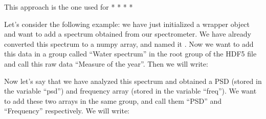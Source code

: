 \documentclass[letterpaper,10pt,english]{sphinxmanual}
\begin{document}
\sphinxAtStartPar
This approach is the one used for
* 
* 
* 
* 

\sphinxAtStartPar
{}
Let’s consider the following example: we have just initialized a wrapper object and want to add a spectrum obtained from our spectrometer. We have already converted this spectrum to a numpy array, and named it . Now we want to add this data in a group called “Water spectrum” in the root group of the HDF5 file and call this raw data “Measure of the year”. Then we will write:

\begin{sphinxVerbatim}[commandchars=\\\{\}]
  
                   
                   
\end{sphinxVerbatim}

\sphinxAtStartPar
Now let’s say that we have analyzed this spectrum and obtained a PSD (stored in the variable “psd”) and frequency array (stored in the variable “freq”). We want to add these two arrays in the same group, and call them “PSD” and “Frequency” respectively. We will write:

\begin{sphinxVerbatim}[commandchars=\\\{\}]
  
              
              
                    
                    
\end{sphinxVerbatim}
\end{document}
